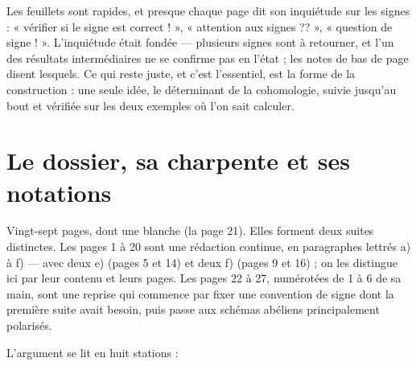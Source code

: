\documentclass[11pt,a4paper]{article}
\begin{document}
\begin{resume}
Les feuillets sont rapides, et presque chaque page dit son inquiétude sur les
signes : « vérifier si le signe est correct ! », « attention aux signes ?? »,
« question de signe ! ». L'inquiétude était fondée — plusieurs signes sont à
retourner, et l'un des résultats intermédiaires ne se confirme pas en l'état ;
les notes de bas de page disent lesquels. Ce qui reste juste, et c'est
l'essentiel, est la forme de la construction : une seule idée, le déterminant
de la cohomologie, suivie jusqu'au bout et vérifiée sur les deux exemples où
l'on sait calculer.

\end{resume}

\section*{Le dossier, sa charpente et ses notations}

Vingt-sept pages, dont une blanche (la page 21). Elles forment deux suites
distinctes. Les pages 1 à 20 sont une rédaction continue, en paragraphes
lettrés a) à f) — avec deux e) (pages 5 et 14) et deux f) (pages 9 et 16) ;
on les distingue ici par leur contenu et leurs pages. Les pages 22 à 27,
numérotées de 1 à 6 de sa main, sont une reprise qui commence par fixer une
convention de signe dont la première suite avait besoin, puis passe aux
schémas abéliens principalement polarisés.

L'argument se lit en huit stations :
\end{document}
